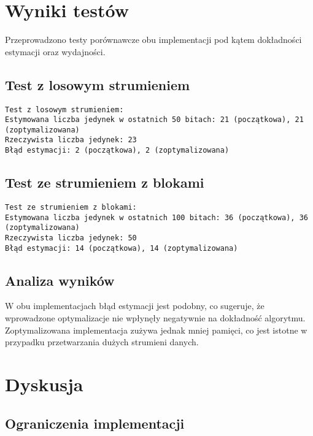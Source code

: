 \documentclass{article}
\begin{document}
\section{Wyniki testów}

Przeprowadzono testy porównawcze obu implementacji pod kątem dokładności estymacji oraz wydajności.

\subsection{Test z losowym strumieniem}

\begin{verbatim}
Test z losowym strumieniem:
Estymowana liczba jedynek w ostatnich 50 bitach: 21 (początkowa), 21 (zoptymalizowana)
Rzeczywista liczba jedynek: 23
Błąd estymacji: 2 (początkowa), 2 (zoptymalizowana)
\end{verbatim}

\subsection{Test ze strumieniem z blokami}

\begin{verbatim}
Test ze strumieniem z blokami:
Estymowana liczba jedynek w ostatnich 100 bitach: 36 (początkowa), 36 (zoptymalizowana)
Rzeczywista liczba jedynek: 50
Błąd estymacji: 14 (początkowa), 14 (zoptymalizowana)
\end{verbatim}

\subsection{Analiza wyników}

W obu implementacjach błąd estymacji jest podobny, co sugeruje, że wprowadzone optymalizacje nie wpłynęły negatywnie na dokładność algorytmu. Zoptymalizowana implementacja zużywa jednak mniej pamięci, co jest istotne w przypadku przetwarzania dużych strumieni danych.

\newpage

\section{Dyskusja}

\subsection{Ograniczenia implementacji}
\end{document}
